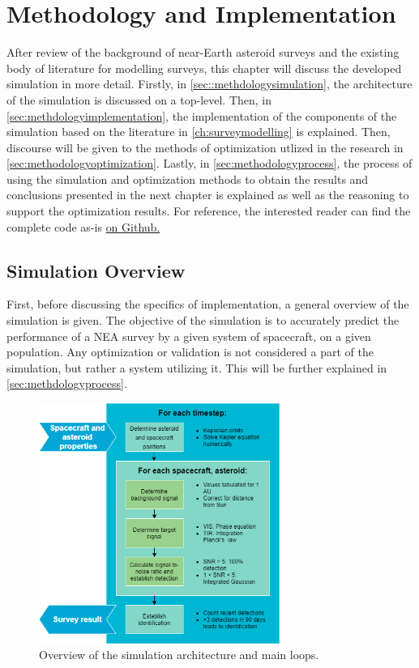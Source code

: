 \chapter{Methodology and Implementation}
\label{ch:experimental}
After review of the background of near-Earth asteroid surveys and the existing body of literature for modelling surveys, this chapter will discuss the developed simulation in more detail. Firstly, in \autoref{sec::methdologysimulation}, the architecture of the simulation is discussed on a top-level. Then, in \autoref{sec:methdologyimplementation}, the implementation of the components of the simulation based on the literature in \autoref{ch:surveymodelling} is explained. Then, discourse will be given to the methods of optimization utlized in the research in \autoref{sec:methodologyoptimization}. Lastly, in \autoref{sec:methodologyprocess}, the process of using the simulation and optimization methods to obtain the results and conclusions presented in the next chapter is explained as well as the reasoning to support the optimization results. For reference, the interested reader can find the complete code as-is \href{https://github.com/ArjanVermeulen97/thesis/tree/main/code}{on Github.}

\section{Simulation Overview}
\label{sec:methodologysimulation}
First, before discussing the specifics of implementation, a general overview of the simulation is given. The objective of the simulation is to accurately predict the performance of a NEA survey by a given system of spacecraft, on a given population. Any optimization or validation is not considered a part of the simulation, but rather a system utilizing it. This will be further explained in \autoref{sec:methdologyprocess}.

\begin{figure}[htbp]
 \centering
 \includegraphics[width=0.7\textwidth]{img/simulation_overview.png}
 \caption{Overview of the simulation architecture and main loops.}
 \label{fig:simulation_overview}
\end{figure}

